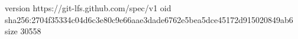 version https://git-lfs.github.com/spec/v1
oid sha256:2704f35334c04d6c3e80c9e66aae3dade6762e5bea5dce45172d915020849ab6
size 30558

